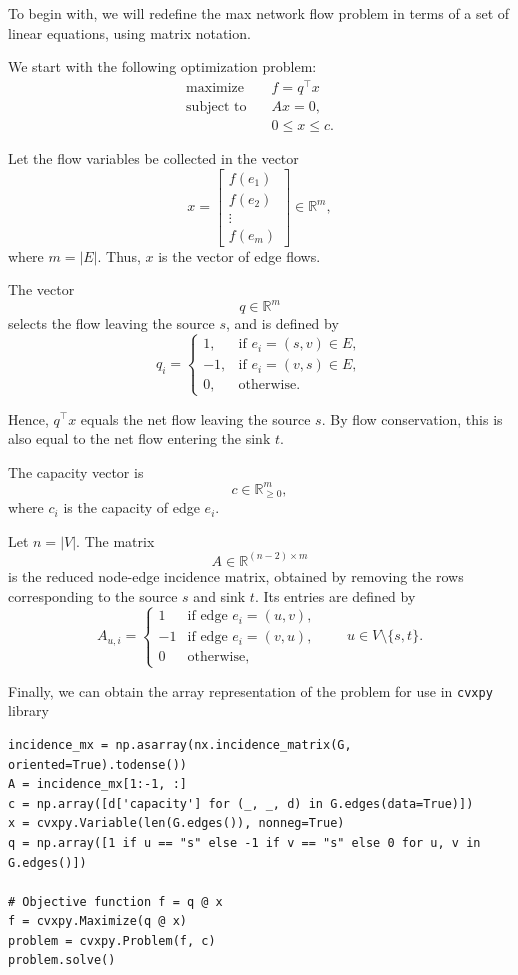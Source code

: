 \documentclass[12pt, openany]{article}
\begin{document}
To begin with, we will redefine the max network flow problem in terms of a set of linear equations, using matrix notation.


We start with the following optimization problem:
\[
\begin{aligned}
\text{maximize} \quad & f = q^\top x \\[4pt]
\text{subject to} \quad
& Ax = 0, \\[4pt]
& 0 \le x \le c .
\end{aligned}
\]

Let the flow variables be collected in the vector
\[
x=
\begin{bmatrix}
f(e_1)\\
f(e_2)\\
\vdots\\
f(e_m)
\end{bmatrix}
\in\mathbb{R}^m,
\]
where \(m=|E|\). Thus, \(x\) is the vector of edge flows.

The vector
\[
q \in \mathbb{R}^m
\]
selects the flow leaving the source \(s\), and is defined by
\[
q_i =
\begin{cases}
1, & \text{if } e_i=(s,v)\in E, \\[4pt]
-1, & \text{if } e_i=(v,s)\in E, \\[4pt]
0, & \text{otherwise.}
\end{cases}
\]

Hence, \(q^\top x\) equals the net flow leaving the source \(s\). By flow conservation, this is also equal to the net flow entering the sink \(t\).

The capacity vector is
\[
c \in \mathbb{R}_{\ge 0}^m,
\]
where \(c_i\) is the capacity of edge \(e_i\).

Let \(n=|V|\). The matrix
\[
A \in \mathbb{R}^{(n-2)\times m}
\]
is the reduced node-edge incidence matrix, obtained by removing the rows corresponding to the source \(s\) and sink \(t\). Its entries are defined by
\[
A_{u,i} =
\begin{cases}
1 & \text{if edge } e_i=(u,v), \\
-1 & \text{if edge } e_i=(v,u), \\
0 & \text{otherwise,}
\end{cases}
\qquad u \in V\setminus\{s,t\}.
\]

Finally, we can obtain the array representation of the problem for use in \texttt{cvxpy} library

\begin{verbatim}
incidence_mx = np.asarray(nx.incidence_matrix(G, oriented=True).todense())
A = incidence_mx[1:-1, :]
c = np.array([d['capacity'] for (_, _, d) in G.edges(data=True)])
x = cvxpy.Variable(len(G.edges()), nonneg=True)
q = np.array([1 if u == "s" else -1 if v == "s" else 0 for u, v in G.edges()])

# Objective function f = q @ x
f = cvxpy.Maximize(q @ x)
problem = cvxpy.Problem(f, c)
problem.solve()
\end{verbatim}
\end{document}
